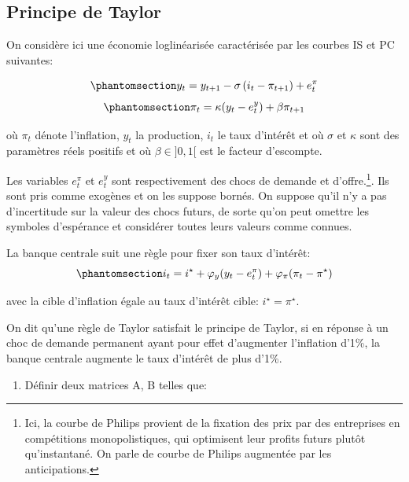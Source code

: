 \documentclass[
  letterpaper,
  DIV=11,
  numbers=noendperiod]{scrartcl}
\providecommand{\tightlist}{%
  \setlength{\itemsep}{0pt}\setlength{\parskip}{0pt}}\usepackage{longtable,booktabs,array}
\begin{document}
\subsection{Principe de Taylor}\label{principe-de-taylor}

On considère ici une économie loglinéarisée caractérisée par les courbes
IS et PC suivantes:

\begin{equation}\phantomsection\label{eq-is}{y_t = y_{t+1} - \sigma \left( i_t - \pi_{t+1} \right) + e^{\pi}_t}\end{equation}
\begin{equation}\phantomsection\label{eq-pc}{\pi_t = \kappa (y_t - e^y_t)  + \beta \pi_{t+1}}\end{equation}

où \(\pi_t\) dénote l'inflation, \(y_t\) la production, \(i_t\) le taux
d'intérêt et où \(\sigma\) et \(\kappa\) sont des paramètres réels
positifs et où \(\beta \in ]0,1[\) est le facteur d'escompte.

Les variables \(e^{\pi}_t\) et \(e^{y}_t\) sont respectivement des chocs
de demande et d'offre.\footnote{Ici, la courbe de Philips provient de la
  fixation des prix par des entreprises en compétitions monopolistiques,
  qui optimisent leur profits futurs plutôt qu'instantané. On parle de
  courbe de Philips augmentée par les anticipations.}. Ils sont pris
comme exogènes et on les suppose bornés. On suppose qu'il n'y a pas
d'incertitude sur la valeur des chocs futurs, de sorte qu'on peut
omettre les symboles d'espérance et considérer toutes leurs valeurs
comme connues.

La banque centrale suit une règle pour fixer son taux d'intérêt:
\begin{equation}\phantomsection\label{eq-taylor}{i_t = i^{\star} + \varphi_y (y_t - e^{\pi}_t) + \varphi_\pi (\pi_t - \pi^{\star})}\end{equation}

avec la cible d'inflation égale au taux d'intérêt cible:
\(i^{\star}=\pi^{\star}\).

On dit qu'une règle de Taylor satisfait le principe de Taylor, si en
réponse à un choc de demande permanent ayant pour effet d'augmenter
l'inflation d'1\%, la banque centrale augmente le taux d'intérêt de plus
d'1\%.

\begin{enumerate}
\def\labelenumi{\arabic{enumi}.}
\tightlist
\item
  Définir deux matrices A, B telles que:
\end{enumerate}
\end{document}
